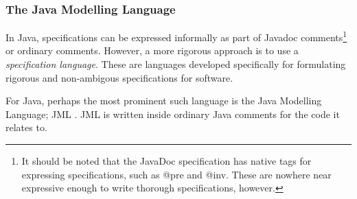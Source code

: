 \documentclass{article}
\newcommand{\tmtextit}[1]{{\itshape{#1}}}
\begin{document}
\subsubsection{The Java Modelling Language}

In Java, specifications can be expressed informally as part of Javadoc
comments{\footnote{It should be noted that the JavaDoc specification has
native tags for expressing specifications, such as @pre and @inv. These are
nowhere near expressive enough to write thorough specifications, however.}} or
ordinary comments. However, a more rigorous approach is to use a
\tmtextit{specification language}. These are languages developed specifically
for formulating rigorous and non-ambigous specifications for software.



For Java, perhaps the most prominent such language is the Java Modelling
Language; JML {\cite{JMLwebsite}}{\cite{JML-Ref-Manual}}. JML is written
inside ordinary Java comments for the code it relates to.
\end{document}
